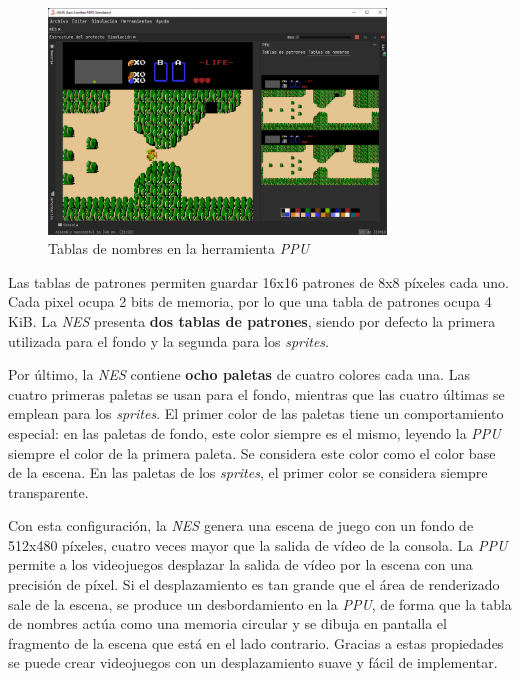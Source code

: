 \begin{figure}[h]
    \centering
    \includegraphics[width=0.8\textwidth]{images/nes/nes-nametables}
    \caption{Tablas de nombres en la herramienta \textit{PPU}}
    \label{fig:nes-nametables}
\end{figure}

Las tablas de patrones permiten guardar 16x16 patrones de
8x8 píxeles cada uno.
Cada pixel ocupa 2 bits de memoria, por lo que una tabla
de patrones ocupa 4 KiB.
La \textit{NES} presenta \textbf{dos tablas de patrones}, siendo
por defecto la primera utilizada para el fondo y la segunda
para los \textit{sprites}.

Por último, la \textit{NES} contiene \textbf{ocho paletas}
de cuatro colores cada una.
Las cuatro primeras paletas se usan para el fondo,
mientras que las cuatro últimas se emplean para los \textit{sprites}.
El primer color de las paletas tiene un comportamiento especial:
en las paletas de fondo, este color siempre es el mismo,
leyendo la \textit{PPU} siempre el color de la primera paleta.
Se considera este color como el color base de la escena.
En las paletas de los \textit{sprites}, el primer color
se considera siempre transparente.

Con esta configuración, la \textit{NES} genera una escena de juego
con un fondo de 512x480 píxeles, cuatro veces mayor que la salida
de vídeo de la consola.
La \textit{PPU} permite a los videojuegos desplazar la salida
de vídeo por la escena con una precisión de píxel.
Si el desplazamiento es tan grande que el área de renderizado
sale de la escena, se produce un desbordamiento en la \textit{PPU},
de forma que la tabla de nombres actúa como una memoria circular
y se dibuja en pantalla el fragmento de la escena que está en el lado contrario.
Gracias a estas propiedades se puede crear videojuegos con
un desplazamiento suave y fácil de implementar.

